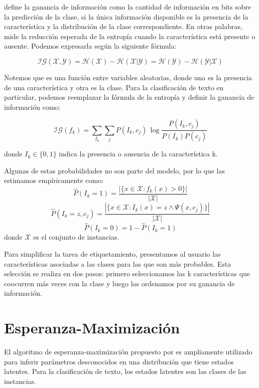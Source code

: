 \citet{infgain} define la ganancia de información como la cantidad de información en bits sobre la predicción de la clase, si la única información disponible es la presencia de la característica y la distribución de la clase correspondiente. En otras palabras, mide la reducción esperada de la entropía cuando la característica está presente o ausente. Podemos expresarla según la siguiente fórmula:

\begin{equation}
\mathcal{IG}(\mathcal{X}, \mathcal{Y}) = \mathcal{H}(\mathcal{X}) - \mathcal{H}(\mathcal{X}|\mathcal{Y}) = \mathcal{H}(\mathcal{Y}) - \mathcal{H}(\mathcal{Y}|\mathcal{X})
\end{equation}

Notemos que es una función entre variables aleatorias, donde una es la presencia de una característica y otra es la clase. Para la clasificación de texto en particular, podemos reemplazar la fórmula de la entropía y definir la ganancia de información como:

\begin{equation}
\mathcal{IG}(f_k) = \sum_{I_k} \sum_j P(I_k, c_j)\,\log \frac{P(I_k,c_j)}{P(I_k)P(c_j)}
\end{equation}

donde $I_k \in \{0, 1\}$ indica la presencia o ausencia de la característica k.

Algunas de estas probabilidades no son parte del modelo, por lo que las estimamos empíricamente como:
$$ \hat{P}(I_k = 1) = \frac{|\{ x \in \mathcal{X}: f_k(x) > 0 \} |}{|\mathcal{X}|} $$
$$ \hat{P}(I_k = z, c_j) = \frac{|\{ x \in \mathcal{X}: I_k(x) = z \wedge \Psi(x, c_j)\} |}{|\mathcal{X}|} $$
$$ \hat{P}(I_k = 0) = 1 - \hat{P}(I_k = 1) $$
donde $\mathcal{X}$ es el conjunto de instancias.

Para simplificar la tarea de etiquetamiento, presentamos al usuario las características asociadas a las clases para las que son más probables. Esta selección se realiza en dos pasos: primero seleccionamos las k características que coocurren más veces con la clase y luego las ordenamos por su ganancia de información.

\section{Esperanza-Maximización}
El algoritmo de esperanza-maximización propuesto por \citet{Dempster-maximumlikelihood} es ampliamente utilizado para inferir parámetros desconocidos en una distribución que tiene estados latentes. Para la clasificación de texto, los estados latentes son las clases de las instancias.

